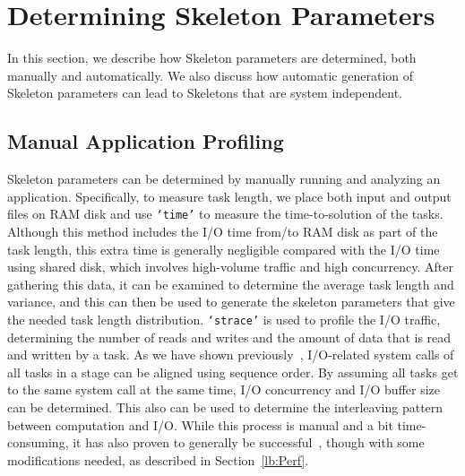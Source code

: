\documentclass[preprint,12pt]{elsarticle}
\newcommand{\katznote}[1]{ {\textcolor{blue}    { ***Dan:   #1 }}}
\newcommand{\zhaonote}[1]{{\textcolor{cyan}{ ***Zhao:  #1 }}}
\newcommand{\katznote}[1]{}
\newcommand{\zhaonote}[1]{}
\newcommand{\T}[1]{\texttt{#1}\xspace}
\begin{document}
%

\section{Determining Skeleton Parameters}
\label{lb:Params}

In this section, we describe how Skeleton parameters are determined, both manually and
automatically.  We also discuss how automatic generation of Skeleton parameters can lead
to Skeletons that are system independent.

\subsection{Manual Application Profiling}
\label{sec:manual-profiling}

Skeleton parameters can be determined by manually running and analyzing an application.
Specifically, to measure task length, we place both input
and output files on RAM disk and use \T{`time'} to measure the time-to-solution of the tasks.
Although this method includes the I/O
time from/to RAM disk as part of the task length, this extra time is generally negligible
compared with the I/O time using shared disk, which involves
high-volume traffic and high concurrency.
After gathering this data, it can be examined to determine
the average task length and variance, and this can then be used to generate the skeleton
parameters that give the needed task length distribution.
\T{`strace'} is used to profile the I/O traffic, determining the number of reads and writes
and the amount of data
that is read and written by a task.
As we have shown previously~\cite{ENVELOPE}, I/O-related system calls
of all tasks in a stage can be aligned using sequence order. By assuming all tasks get to the
same system call at the same time, I/O concurrency and I/O buffer size can be determined.
This also can be used to determine the interleaving pattern between computation and I/O.  
While this process is manual and a bit time-consuming, it
has also proven to generally be successful~\cite{Skeleton2014}, though with some modifications needed, as described in Section~\ref{lb:Perf}.
\end{document}
